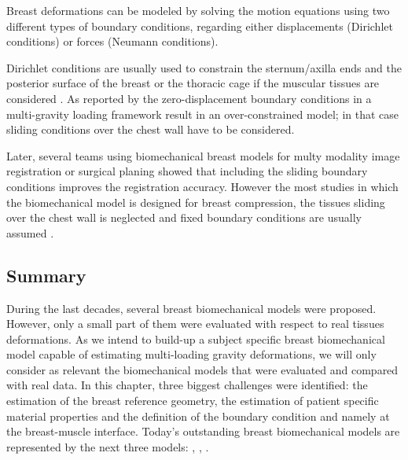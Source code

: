 Breast deformations can be modeled by solving the
motion equations using two different types of boundary
conditions, regarding either displacements (Dirichlet conditions) or forces (Neumann conditions).

Dirichlet conditions are usually used to constrain the sternum/axilla ends and the posterior surface of the breast or the thoracic cage if the muscular tissues are considered \citep{griesenauer_breast_2017,rajagopal_creating_2008,pathmanathan_predicting_2008, gamage_modelling_2012,griesenauer_breast_2017}. As reported by \cite{carter_biomechanical_2009} the zero-displacement boundary conditions in a multi-gravity loading framework result in an over-constrained model; in that case sliding conditions over the chest wall have to be considered.    

  Later, several teams using biomechanical breast models for multy modality image registration or surgical planing showed that including the sliding boundary conditions \citep{georgii_simulation_2016,han_nonlinear_2014}  improves the registration accuracy. However the most studies in which the biomechanical model is designed for breast compression, the tissues sliding over the chest wall is neglected and fixed boundary conditions are usually assumed \citep{sturgeon_finite_element_2016, martinez_finite_2017}.
  
 \subsection{Summary}
 
 During the last decades, several breast biomechanical models were proposed. However, only a small part of them \citep{carter_biomechanical_2009,gamage_modelling_2012,han_nonlinear_2014} were evaluated with respect to real tissues deformations. As we intend to build-up a subject specific breast biomechanical model capable of estimating multi-loading gravity deformations, we will only consider as relevant the biomechanical models that were evaluated and compared with real data. In this chapter, three biggest challenges were identified:  the estimation of the breast reference geometry, the estimation of patient specific material properties and the definition of the boundary condition and namely at the breast-muscle interface. Today's outstanding breast biomechanical models are represented by the next three models:   \cite{eiben_surface_2016}, \cite{han_nonlinear_2014}, \cite{gamage_modelling_2012}.   

